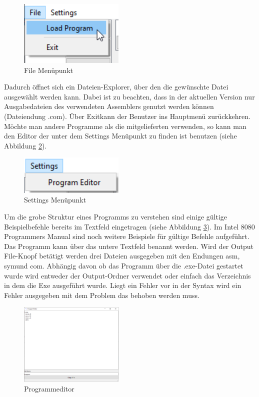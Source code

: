 \documentclass[12pt]{article}
\newcommand{\imgSpaceBefore}{\vspace{10pt}}
\begin{document}
\begin{figure}[H]
\centering
\includegraphics[width=5cm]{bilder/LoadFile}
\caption{File Menüpunkt}
\label{fig:LoadFile}
\end{figure}

\noindent
Dadurch öffnet sich ein Dateien-Explorer, über den die gewünschte Datei ausgewählt werden kann. Dabei ist zu beachten, dass in der aktuellen Version nur Ausgabedateien des verwendeten Assemblers genutzt werden können (Dateiendung \glqq .com\grqq). Über \glqq Exit\grqq kann der Benutzer ins Hauptmenü zurückkehren. Möchte man andere Programme als die mitgelieferten verwenden, so kann man den Editor der unter dem Settings Menüpunkt zu finden ist benutzen (siehe Abbildung \ref{fig:Settings}).\imgSpaceBefore

\begin{figure}[H]
\centering
\includegraphics[width=5cm]{bilder/Settings}
\caption{Settings Menüpunkt}
\label{fig:Settings}
\end{figure}

Um die grobe Struktur eines Programms zu verstehen sind einige gültige Beispielbefehle bereits im Textfeld eingetragen (siehe Abbildung \ref{fig:ProgEdit}). Im Intel 8080 Programmers Manual sind noch weitere Beispiele für gültige Befehle aufgeführt. Das Programm kann über das untere Textfeld benannt werden. Wird der \glqq Output File\grqq-Knopf betätigt werden drei Dateien ausgegeben mit den Endungen \glqq asm\grqq, \glqq sym\grqq und \glqq com\grqq. Abhängig davon ob das Programm über die .exe-Datei gestartet wurde wird entweder der \glqq Output\grqq-Ordner verwendet oder einfach das Verzeichnis in dem die Exe ausgeführt wurde. Liegt ein Fehler vor in der Syntax wird ein Fehler ausgegeben mit dem Problem das behoben werden muss.\imgSpaceBefore

\begin{figure}[H]
\centering
\includegraphics[width=5cm]{bilder/ProgramEditor}
\caption{Programmeditor}
\label{fig:ProgEdit}
\end{figure}
\end{document}
